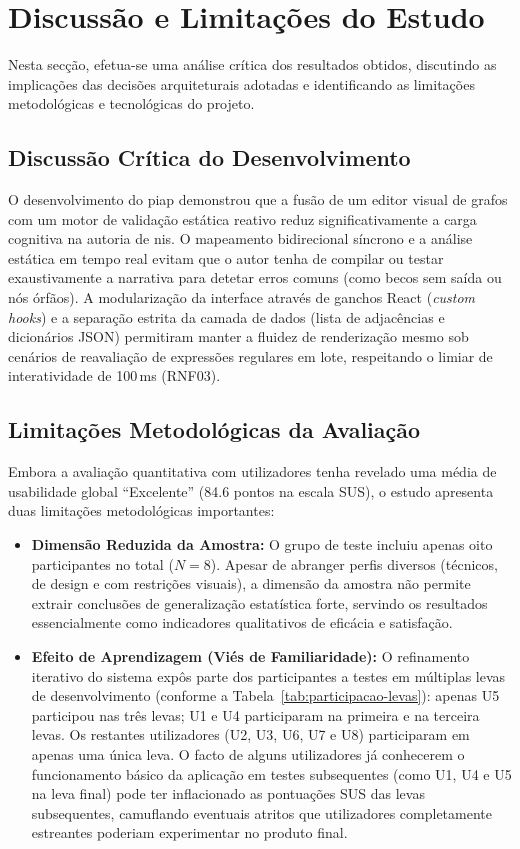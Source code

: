 \section{Discussão e Limitações do Estudo}
\label{sec:discussao-limitacoes-estudo}

Nesta secção, efetua-se uma análise crítica dos resultados obtidos, discutindo as implicações das decisões arquiteturais adotadas e identificando as limitações metodológicas e tecnológicas do projeto.

\subsection{Discussão Crítica do Desenvolvimento}
O desenvolvimento do \gls{piap} demonstrou que a fusão de um editor visual de grafos com um motor de validação estática reativo reduz significativamente a carga cognitiva na autoria de \glspl{ni}. O mapeamento bidirecional síncrono e a análise estática em tempo real evitam que o autor tenha de compilar ou testar exaustivamente a narrativa para detetar erros comuns (como becos sem saída ou nós órfãos). A modularização da interface através de ganchos React (\textit{custom hooks}) e a separação estrita da camada de dados (lista de adjacências e dicionários JSON) permitiram manter a fluidez de renderização mesmo sob cenários de reavaliação de expressões regulares em lote, respeitando o limiar de interatividade de 100\,ms (RNF03).

\subsection{Limitações Metodológicas da Avaliação}
Embora a avaliação quantitativa com utilizadores tenha revelado uma média de usabilidade global ``Excelente'' (84.6 pontos na escala SUS), o estudo apresenta duas limitações metodológicas importantes:
\begin{itemize}
    \item \textbf{Dimensão Reduzida da Amostra:} O grupo de teste incluiu apenas oito participantes no total ($N = 8$). Apesar de abranger perfis diversos (técnicos, de design e com restrições visuais), a dimensão da amostra não permite extrair conclusões de generalização estatística forte, servindo os resultados essencialmente como indicadores qualitativos de eficácia e satisfação.
    \item \textbf{Efeito de Aprendizagem (Viés de Familiaridade):} O refinamento iterativo do sistema expôs parte dos participantes a testes em múltiplas levas de desenvolvimento (conforme a Tabela~\ref{tab:participacao-levas}): apenas U5 participou nas três levas; U1 e U4 participaram na primeira e na terceira levas. Os restantes utilizadores (U2, U3, U6, U7 e U8) participaram em apenas uma única leva. O facto de alguns utilizadores já conhecerem o funcionamento básico da aplicação em testes subsequentes (como U1, U4 e U5 na leva final) pode ter inflacionado as pontuações SUS das levas subsequentes, camuflando eventuais atritos que utilizadores completamente estreantes poderiam experimentar no produto final.
\end{itemize}

